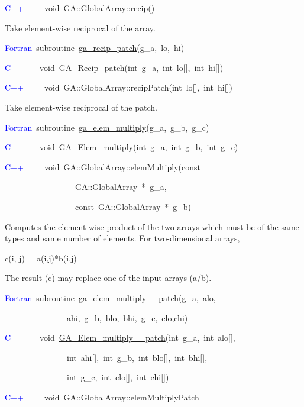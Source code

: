 \textcolor{blue}{C++}~~~~~void~GA::GlobalArray::recip()

Take element-wise reciprocal of the array.

\textcolor{blue}{Fortran}~subroutine~\href{https://hpc.pnl.gov/globalarrays/api/f_op_api.html\#ga_recip_patch}{ga\_{}recip\_{}patch}(g\_a,~lo,~hi)~

\textcolor{blue}{C}~~~~~~~void~\href{https://hpc.pnl.gov/globalarrays/api/c_op_api.html\#ga_recip_patch}{GA\_{}Recip\_{}patch}(int~g\_a,~int~lo{[}{]},~int~hi{[}{]})

\textcolor{blue}{C++~}~~~~void~GA::GlobalArray::recipPatch(int~lo{[}{]},~int~hi{[}{]})

Take element-wise reciprocal of the patch.

\textcolor{blue}{Fortran}~subroutine~\href{https://hpc.pnl.gov/globalarrays/api/f_op_api.html\#ga_elem_multiply}{ga\_{}elem\_{}multiply}(g\_a,~g\_b,~g\_c)

\textcolor{blue}{C}~~~~~~~void~\href{https://hpc.pnl.gov/globalarrays/api/c_op_api.html\#ga_elem_multiply}{GA\_{}Elem\_{}multiply}(int~g\_a,~int~g\_b,~int~g\_c)~

\textcolor{blue}{C++}~~~~~void~GA::GlobalArray::elemMultiply(const~

~~~~~~~~~~~~~~~~~GA::GlobalArray~{*}~g\_a,~

~~~~~~~~~~~~~~~~~const~GA::GlobalArray~{*}~g\_b)

Computes the element-wise product of the two arrays which must be
of the same types and same number of elements. For two-dimensional
arrays,

c(i, j) = a(i,j){*}b(i,j)

The result (c) may replace one of the input arrays (a/b). 

\textcolor{blue}{Fortran}~subroutine~\href{https://hpc.pnl.gov/globalarrays/api/f_op_api.html\#ga_elem_multiply_patch}{ga\_{}elem\_{}multiply\_{}\_{}patch}(g\_a,~alo,~

~~~~~~~~~~~~~~~ahi,~g\_b,~blo,~bhi,~g\_c,~clo,chi)~

\textcolor{blue}{C}~~~~~~~void~\href{https://hpc.pnl.gov/globalarrays/api/c_op_api.html\#ga_elem_multiply_patch}{GA\_{}Elem\_{}multiply\_{}\_{}patch}(int~g\_a,~int~alo{[}{]},~

~~~~~~~~~~~~~~~int~ahi{[}{]},~int~g\_b,~int~blo{[}{]},~int~bhi{[}{]},

~~~~~~~~~~~~~~~int~g\_c,~int~clo{[}{]},~int~chi{[}{]})~

\textcolor{blue}{C++~}~~~~void~GA::GlobalArray::elemMultiplyPatch

